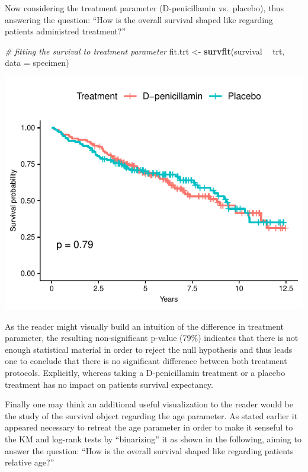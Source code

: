 \documentclass[]{article}
\newenvironment{Shaded}{\begin{snugshade}}{\end{snugshade}}
\newcommand{\KeywordTok}[1]{\textcolor[rgb]{0.13,0.29,0.53}{\textbf{#1}}}
\newcommand{\DataTypeTok}[1]{\textcolor[rgb]{0.13,0.29,0.53}{#1}}
\newcommand{\StringTok}[1]{\textcolor[rgb]{0.31,0.60,0.02}{#1}}
\newcommand{\CommentTok}[1]{\textcolor[rgb]{0.56,0.35,0.01}{\textit{#1}}}
\newcommand{\OperatorTok}[1]{\textcolor[rgb]{0.81,0.36,0.00}{\textbf{#1}}}
\newcommand{\NormalTok}[1]{#1}
\begin{document}
Now considering the treatment parameter (D-penicillamin vs.~placebo),
thus answering the question: ``How is the overall survival shaped like
regarding patients administred treatment?''

\begin{Shaded}
\begin{Highlighting}[]
\CommentTok{# fitting the survival to treatment parameter}
\NormalTok{fit.trt <-}\StringTok{ }\KeywordTok{survfit}\NormalTok{(survival }\OperatorTok{~}\StringTok{ }\NormalTok{trt, }\DataTypeTok{data =}\NormalTok{ specimen)}
\end{Highlighting}
\end{Shaded}

\includegraphics{survival_pbc_files/figure-latex/unnamed-chunk-17-1.pdf}

As the reader might visually build an intuition of the difference in
treatment parameter, the resulting non-significant p-value (79\%)
indicates that there is not enough statistical material in order to
reject the null hypothesis and thus leads one to conclude that there is
no significant difference between both treatment protocols. Explicitly,
whereas taking a D-penicillamin treatment or a placebo treatment has no
impact on patients survival expectancy.

Finally one may think an additional useful visualization to the reader
would be the study of the survival object regarding the age parameter.
As stated earlier it appeared necessary to retreat the age parameter in
order to make it senseful to the KM and log-rank tests by ``binarizing''
it as shown in the following, aiming to answer the question: ``How is
the overall survival shaped like regarding patients relative age?''
\end{document}

